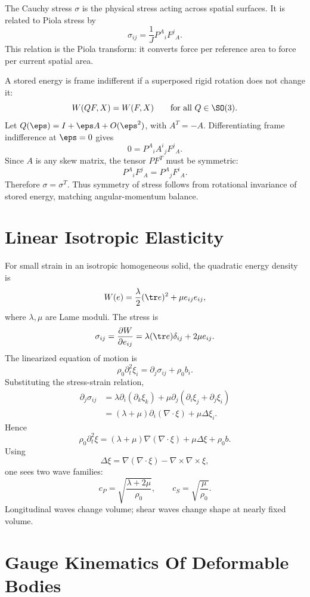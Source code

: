 The Cauchy stress \(\sigma\) is the physical stress acting across spatial
surfaces. It is related to Piola stress by
\[
  \boxed{
  \sigma_{ij}
  =
  \frac1J P^A{}_iF^j{}_A.
  }
\]
This relation is the Piola transform: it converts force per reference area to
force per current spatial area.

A stored energy is frame indifferent if a superposed rigid rotation does not
change it:
\[
  W(QF,X)=W(F,X)\qquad\text{for all }Q\in\SO(3).
\]
Let \(Q(\eps)=I+\eps A+O(\eps^2)\), with \(A^T=-A\). Differentiating
frame indifference at \(\eps=0\) gives
\[
  0=
  P^A{}_iA^i{}_jF^j{}_A.
\]
Since \(A\) is any skew matrix, the tensor \(PF^T\) must be symmetric:
\[
  P^A{}_iF^j{}_A=P^A{}_jF^i{}_A.
\]
Therefore \(\sigma=\sigma^T\). Thus symmetry of stress follows from rotational
invariance of stored energy, matching angular-momentum balance.

\section{Linear Isotropic Elasticity}
\label{sec:linear-isotropic-elasticity}

For small strain in an isotropic homogeneous solid, the quadratic energy density
is
\[
  W(e)=\frac{\lambda}{2}(\tr e)^2+\mu e_{ij}e_{ij},
\]
where \(\lambda,\mu\) are Lame moduli. The stress is
\[
  \sigma_{ij}
  =
  \frac{\partial W}{\partial e_{ij}}
  =
  \lambda(\tr e)\delta_{ij}+2\mu e_{ij}.
\]
The linearized equation of motion is
\[
  \rho_0\partial_t^2\xi_i=\partial_j\sigma_{ij}+\rho_0 b_i.
\]
Substituting the stress-strain relation,
\[
\begin{aligned}
  \partial_j\sigma_{ij}
  &=
  \lambda\partial_i(\partial_k\xi_k)
  +
  \mu\partial_j(\partial_i\xi_j+\partial_j\xi_i)\\
  &=
  (\lambda+\mu)\partial_i(\nabla\cdot\xi)
  +
  \mu\Delta\xi_i.
\end{aligned}
\]
Hence
\[
  \boxed{
  \rho_0\partial_t^2\xi
  =
  (\lambda+\mu)\nabla(\nabla\cdot\xi)
  +
  \mu\Delta\xi
  +
  \rho_0 b.
  }
\]
Using
\[
  \Delta\xi=\nabla(\nabla\cdot\xi)-\nabla\times\nabla\times\xi,
\]
one sees two wave families:
\[
  c_P=\sqrt{\frac{\lambda+2\mu}{\rho_0}},
  \qquad
  c_S=\sqrt{\frac{\mu}{\rho_0}}.
\]
Longitudinal waves change volume; shear waves change shape at nearly fixed
volume.

\section{Gauge Kinematics Of Deformable Bodies}
\label{sec:gauge-kinematics-deformable-bodies}

